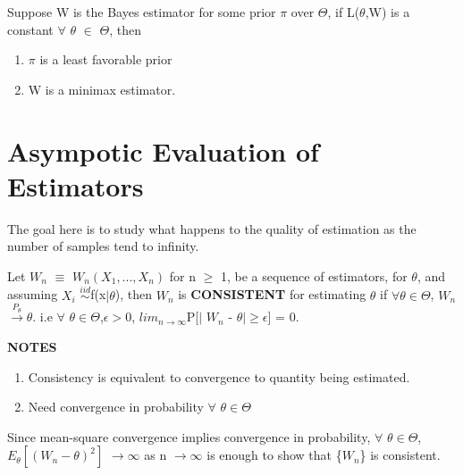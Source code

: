 \documentclass[a4paper,english,12pt]{article}
\begin{document}
\begin{thm}
	Suppose W is the Bayes estimator for some prior $\pi$ over $\Theta$,
	\newline if L($\theta$,W) is a constant $\forall$ $\theta$ $\in$ $\Theta$, then
	\begin{enumerate}
		\item $\pi$ is  a least favorable prior
		\item W is a minimax estimator.
	\end{enumerate}
\end{thm}
\section{Asympotic Evaluation of Estimators}
The goal here is to study what happens to the quality of estimation as the number of samples tend to infinity.
\begin{defn}
	Let $W_n$ $\equiv$ $W_n(X_1,...,X_n)$ for n $\geq$ 1, be a sequence of estimators, for $\theta$, and assuming $X_i$
	$\overset{iid}{\sim}$f(x$\vert \theta$), then $W_n$ is \textbf{CONSISTENT} for estimating $\theta$ if $\forall\theta\in\Theta$, $W_n$ $\overset{P_\theta}{\rightarrow} \theta$.
	\newline i.e $\forall$ $\theta\in\Theta$,$\epsilon >0$, $lim_{n \rightarrow \infty}$P[$\vert$ $W_n$ - $\theta \vert \geq \epsilon$] = 0.
\end{defn}

\textbf{NOTES}
\begin{enumerate}
	\item Consistency is equivalent to convergence to quantity being estimated.
	\item Need convergence in probability $\forall$ $\theta\in\Theta$
\end{enumerate}

Since mean-square convergence implies convergence in probability,
\newline $\forall$ $\theta\in\Theta$, $E_\theta[(W_n-\theta)^2]$ $\rightarrow \infty$  as n $\rightarrow \infty$  is enough to show that \{$W_n$\} is consistent.
\end{document}
